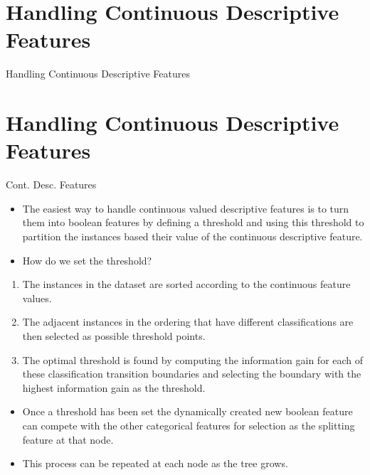 \documentclass[xcolor={table}]{beamer}
\newcommand{\SectionSlideShortHeader}[3][]{
	\ifthenelse{\isempty{#1}}
		{\section[#3]{#2}\begin{frame} \begin{center}\begin{huge}#2\end{huge}\end{center}\end{frame}}
		{\section[#1]{#2}\begin{frame} \begin{center}\begin{huge}#3\end{huge}\end{center}\end{frame}}
}
\begin{document}
\SectionSlideShortHeader{Handling Continuous Descriptive Features}{Cont. Desc. Features}

\begin{frame}
	\begin{itemize}
	\item The easiest way to handle continuous valued descriptive features is to turn them into boolean features by defining a threshold  and using this threshold to partition the instances based their value of the continuous  descriptive feature.
	\item How do we set the threshold?
	\end{itemize}
\end{frame}

\begin{frame}
	\begin{enumerate}
	\item The instances in the dataset are sorted according to the continuous feature values. 
	\item The adjacent instances in the ordering that have different classifications are then selected as possible threshold points. 
	\item The optimal threshold is found by computing the information gain for each of these classification transition boundaries and selecting the boundary with the highest information gain as the threshold. 
	\end{enumerate}
\end{frame}

\begin{frame}
	\begin{itemize}
		\item Once a threshold has been set the dynamically created new boolean feature can compete with the other categorical features for selection as the splitting feature at that node.
		\item This process can be repeated at each node as the tree grows.
	\end{itemize}
\end{frame}
\end{document}
